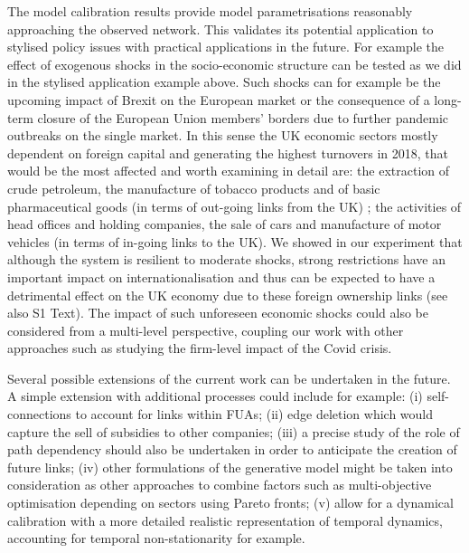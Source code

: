 \documentclass[10pt,letterpaper]{article}
\begin{document}
The model calibration results provide model parametrisations reasonably approaching the observed network. This validates its potential application to stylised policy issues with practical applications in the future. For example the effect of exogenous shocks in the socio-economic structure can be tested as we did in the stylised application example above. Such shocks can for example be the upcoming impact of Brexit on the European market or the consequence of a long-term closure of the European Union members' borders due to further pandemic outbreaks on the single market. In this sense the UK economic sectors mostly dependent on foreign capital and generating the highest turnovers in 2018, that would be the most affected and worth examining in detail are: the extraction of crude petroleum, the manufacture of tobacco products and of basic pharmaceutical goods (in terms of out-going links from the UK) ; the activities of head offices and holding companies, the sale of cars and manufacture of motor vehicles (in terms of in-going links to the UK). We showed in our experiment that although the system is resilient to moderate shocks, strong restrictions have an important impact on internationalisation and thus can be expected to have a detrimental effect on the UK economy due to these foreign ownership links (see also S1 Text). The impact of such unforeseen economic shocks could also be considered from a multi-level perspective, coupling our work with other approaches such as \cite{Dorretal2022} studying the firm-level impact of the Covid crisis.

Several possible extensions of the current work can be undertaken in the future. A simple extension with additional processes could include for example: (i) self-connections to account for links within FUAs; (ii) edge deletion which would capture the sell of subsidies to other companies; (iii) a precise study of the role of path dependency should also be undertaken in order to anticipate the creation of future links; (iv) other formulations of the generative model might be taken into consideration as other approaches to combine factors such as multi-objective optimisation depending on sectors using Pareto fronts; (v) allow for a dynamical calibration with a more detailed realistic representation of temporal dynamics, accounting for temporal non-stationarity for example.
\end{document}

